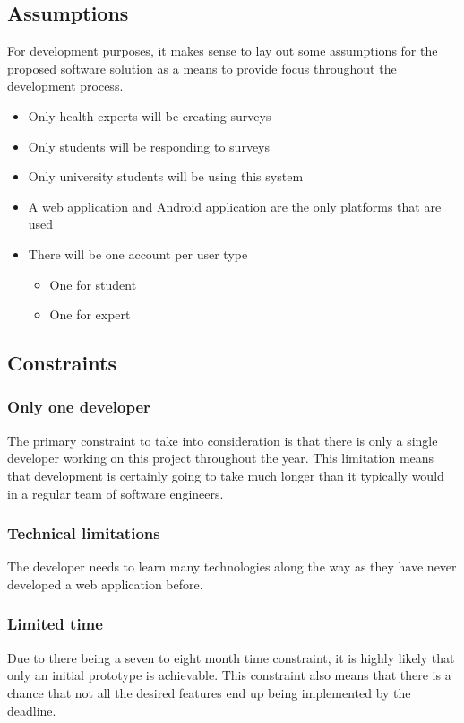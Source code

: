 \subsection{Assumptions}
For development purposes, it makes sense to lay out some assumptions for the proposed software solution as a means to provide focus throughout the development process.

\begin{itemize}
    \tightlist
    \item Only health experts will be creating surveys
    \item Only students will be responding to surveys
    \item Only university students will be using this system
    \item A web application and Android application are the only platforms that are used
    \item There will be one account per user type
    \begin{itemize}
        \item One for student
        \item One for expert
    \end{itemize}
\end{itemize}


\subsection{Constraints}

\subsubsection*{Only one developer}
The primary constraint to take into consideration is that there is only a single developer working on this project throughout the year.
This limitation means that development is certainly going to take much longer than it typically would in a regular team of software engineers.

\subsubsection*{Technical limitations}
The developer needs to learn many technologies along the way as they have never developed a web application before.

\subsubsection*{Limited time}
Due to there being a seven to eight month time constraint, it is highly likely that only an initial prototype is achievable.
This constraint also means that there is a chance that not all the desired features end up being implemented by the deadline. 


